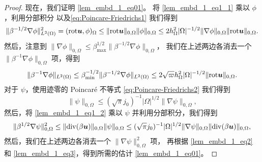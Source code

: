 \begin{proof}
现在，我们证明 \eqref{lem_embd_1_eq01}。
将 \eqref{lem_embd_1_eq1_1} 乘以 $\phi$，利用分部积分
以及\eqref{eq:Poincare-Friedrichs1} 我们得到
$$
  \|\beta^{-1/2}\nabla\phi\|^2_{L^2(\Omega)} = (\mathrm{rot}\boldsymbol{u}, \phi)_{\Omega}
  \le \| \mathrm{rot}\boldsymbol{u} \|_{0,\Omega} \|\phi\|_{0,\Omega}
  \le 2 h^2_{\Omega}|\Omega|^{-1/2}  \|\nabla \phi\|_{0,\Omega} \| \mathrm{rot}\boldsymbol{u} \|_{0,\Omega}.
$$
然后，注意到 $\|\nabla \phi\|_{0,\Omega} \le \beta_{\max}^{1/2} \| \beta^{-1/2} \nabla \phi\|_{0,\Omega}$，
我们在上述两边各消去一个 $\| \beta^{-1} \nabla \phi\|_{0,\Omega}$ 项，得到
\begin{equation}
  \label{lem_embd_1_eq3}
  \|\beta^{-1}\nabla\phi\|_{L^2(\Omega)} \le \beta_{\min}^{-1/2} \|\beta^{-1/2}\nabla\phi\|_{L^2(\Omega)} 
  \le 2 \sqrt{\varpi}  h^2_{\Omega}|\Omega|^{-1/2} \| \mathrm{rot}\boldsymbol{u} \|_{0,\Omega}.
\end{equation}
对于 $\psi$，使用迹零的 Poincar\'e 不等式 \eqref{eq:Poincare-Friedrichs2}
我们得到
$$
\|  \psi \|_{0,\Omega} \le ( \sqrt{\pi} j_0)^{-1} |\Omega|^{1/2} \| \nabla \psi \|_{0,\Omega},
$$
然后，将 \eqref{lem_embd_1_eq1_2} 乘以 $\psi$ 并利用分部积分，我们得到
\begin{equation}
  \label{lem_embd_1_eq4}
\| \beta^{1/2} \nabla \psi \|^2_{0,\Omega} 
\le \| \mathrm{div}(\beta\boldsymbol{u}) \|_{0,\Omega} \| \psi \|_{0,\Omega}
\le ( \sqrt{\pi} j_0)^{-1} |\Omega|^{1/2} \| \nabla \psi \|_{0,\Omega} \| \mathrm{div}(\beta\boldsymbol{u}) \|_{0,\Omega},
\end{equation}
然后，我们在上述两边各消去一个 $\| \nabla \psi \|^2_{0,\Omega}$ 项，
再根据 \eqref{lem_embd_1_eq2} 和 \eqref{lem_embd_1_eq3}，得到所需的估计 \eqref{lem_embd_1_eq01}。
\end{proof}
\vspace{20pt}

